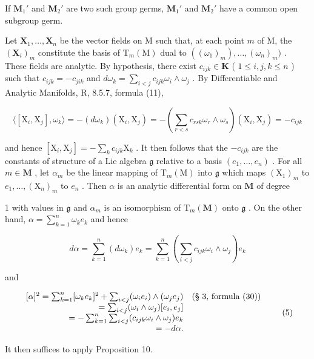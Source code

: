 If \(\mathbf{M}_1'\) and \(\mathbf{M}_2'\) are two such group germs, \(\mathbf{M}_1'\) and \(\mathbf{M}_2'\) have a common open subgroup germ.

Let \(\mathbf{X}_1, \ldots, \mathbf{X}_n\) be the vector fields on M such that, at each point \(m\) of M, the \((\mathbf{X}_i)_m\) constitute the basis of \(\mathrm{T}_m(\mathrm{M})\) dual to \(((\omega_1)_m), \ldots, (\omega_n)_m)\) . These fields are analytic. By hypothesis, there exist \(c_{ijk} \in \mathbf{K}\) ( \(1 \leqslant i,j, k \leqslant n\) ) such that \(c_{ijk} = -c_{jik}\) and \(d\omega_k = \sum_{i < j} c_{ijk}\omega_i \wedge \omega_j\) . By Differentiable and Analytic Manifolds, R, 8.5.7, formula (11),

\[
\langle [ \mathrm{X} _ {i}, \mathrm{X} _ {j} ], \omega_ {k} \rangle = - (d \omega_ {k}) (\mathrm{X} _ {i}, \mathrm{X} _ {j}) = - \left(\sum_ {r <   s} c _ {r s k} \omega_ {r} \wedge \omega_ {s}\right) (\mathrm{X} _ {i}, \mathrm{X} _ {j}) = - c _ {i j k}
\]

and hence \([\mathrm{X}_i,\mathrm{X}_j] = -\sum_{k}c_{ijk}\mathrm{X}_k\) . It then follows that the \(-c_{ijk}\) are the constants of structure of a Lie algebra \(\mathfrak{g}\) relative to a basis \((e_1,\dots ,e_n)\) . For all \(m\in \mathbf{M}\) , let \(\alpha_{m}\) be the linear mapping of \(\mathrm{T}_{m}(\mathrm{M})\) into \(\mathfrak{g}\) which maps \((\mathrm{X}_1)_m\) to \(e_1,\ldots ,(\mathrm{X}_n)_m\) to \(e_n\) . Then \(\alpha\) is an analytic differential form on \(\mathbf{M}\) of degree

1 with values in \(\mathfrak{g}\) and \(\alpha_{m}\) is an isomorphism of \(\mathrm{T}_m(\mathbf{M})\) onto \(\mathfrak{g}\) . On the other hand, \(\alpha = \sum_{k=1}^{n} \omega_k e_k\) and hence

\[
d \alpha = \sum_ {k = 1} ^ {n} (d \omega_ {k}) e _ {k} = \sum_ {k = 1} ^ {n} \left(\sum_ {i <   j} c _ {i j k} \omega_ {i} \wedge \omega_ {j}\right) e _ {k}
\]

and

\[
\begin{array}{r l} {[ \alpha ] ^ {2} = \sum_ {k = 1} ^ {n} [ \omega_ {k} e _ {k} ] ^ {2} + \sum_ {i <   j} (\omega_ {i} e _ {i}) \wedge (\omega_ {j} e _ {j})} & {\text {(§ 3, formula (30))}} \\ {= \sum_ {i <   j} (\omega_ {i} \wedge \omega _ {j}) [ e _ {i}, e _ {j} ]} \\ {= - \sum_ {k = 1} ^ {n} \sum_ {i <   j} (c _ {i j k} \omega_ {i} \wedge \omega_ {j}) e _ {k}} \\ {= - d \alpha.} \end{array}\tag{5}
\]

It then suffices to apply Proposition 10.

